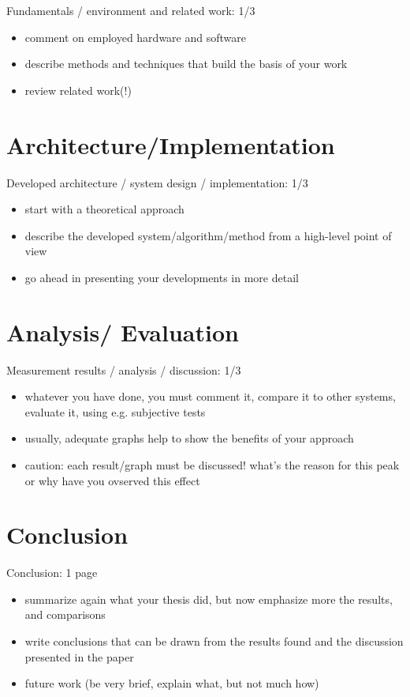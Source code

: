 Fundamentals / environment and related work: 1/3

\begin{itemize}
    \item comment on employed hardware and software
    \item describe methods and techniques that build the basis of your work
    \item review related work(!)
\end{itemize}

\chapter{Architecture/Implementation}

Developed architecture / system design / implementation: 1/3

\begin{itemize}
    \item start with a theoretical approach
    \item describe the developed system/algorithm/method from a high-level point of view
    \item go ahead in presenting your developments in more detail
\end{itemize}


\chapter{Analysis/ Evaluation}

Measurement results / analysis / discussion: 1/3

\begin{itemize}
    \item whatever you have done, you must comment it, compare it to other systems, evaluate it, using e.g. subjective tests
    \item usually, adequate graphs help to show the benefits of your approach
    \item caution: each result/graph must be discussed! what's the reason for this peak or why have you ovserved this effect
\end{itemize}


\chapter{Conclusion}

Conclusion: 1 page

\begin{itemize}
    \item summarize again what your thesis did, but now emphasize more the results, and comparisons
    \item write conclusions that can be drawn from the results found and the discussion presented in the paper
    \item future work (be very brief, explain what, but not much how)
\end{itemize}



